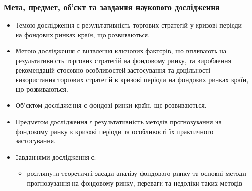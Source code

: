 \documentclass[aspectratio=169]{beamer}
\begin{document}
\begin{frame}
\frametitle{Мета, предмет, об’єкт та завдання наукового дослідження}
\begin{itemize}
\item \alert {Темою дослідження} є результативність торгових стратегій у кризові періоди на фондових ринках країн, що розвиваються.
\tinyskip
\item \alert {Метою дослідження} є виявлення ключових факторів, що впливають на результативність торгових стратегій на фондовому ринку, та вироблення рекомендацій стосовно особливостей застосування та доцільності використання торгових стратегій в кризові періоди на фондових ринках країн, що розвиваються.
\tinyskip
\item \alert {Об’єктом дослідження} є фондові ринки країн, що розвиваються.
\tinyskip
\item \alert {Предметом дослідження} є результативність методів прогнозування на фондовому ринку в кризові періоди та особливості їх практичного застосування.
\tinyskip
\item \alert {Завданнями дослідження} є:
\begin{itemize}
    \item[\textcolor{orange}{\textbullet}] розглянути теоретичні засади аналізу фондового ринку та основні методи прогнозування на фондовому ринку, переваги та недоліки таких методів
\end{itemize}
\end{itemize}
\end{frame}
\end{document}
